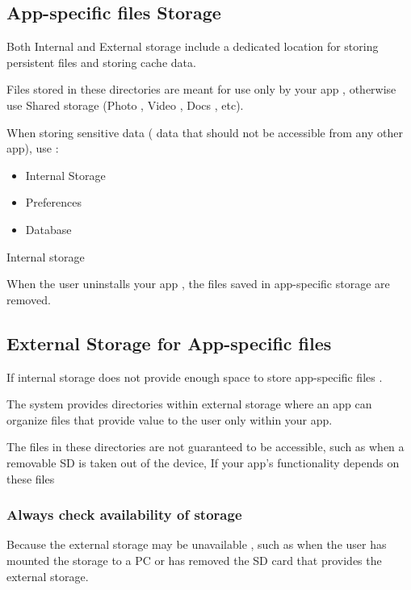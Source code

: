 \documentclass{article}
\begin{document}
  \subsection{App-specific files Storage}

  Both Internal and External storage include a dedicated location for storing persistent files and storing cache data.

  Files stored in these directories are meant for use only by your app , otherwise use Shared storage (Photo , Video , Docs , etc).


  When storing sensitive data ( data that should not be accessible from any other app), use :

  \begin{itemize}
      \item Internal Storage
    \item Preferences
    \item Database
  \end{itemize}

  Internal storage 

  When the user uninstalls your app , the files saved in app-specific storage are removed.

  \subsection{External Storage for App-specific files}

  If internal storage does not provide enough space to store app-specific files .
  
  The system provides directories within external storage where an app can organize files that provide value to the user only within your app.

  The files in these directories are not guaranteed to be accessible, such as when a removable SD is taken out of the device, If your app's functionality depends on these files 

\subsubsection{Always check availability of storage}

Because the external storage may be unavailable , such as when the user has mounted the storage to a PC or has removed the SD card that provides the external storage.
\end{document}
